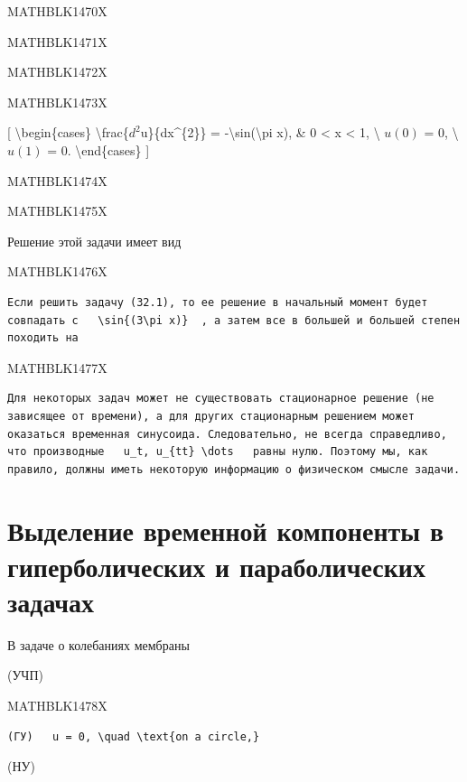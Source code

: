 \documentclass[
]{article}
\begin{document}
{{{MATHBLK1470X

MATHBLK1471X

MATHBLK1472X

MATHBLK1473X

{[} \textbackslash begin\{cases\}
\textbackslash frac\{\(d^{2}\)u\}\{dx\^{}\{2\}\} =
-\textbackslash sin(\textbackslash pi x), \& 0 \textless{} x \textless{}
1, \textbackslash{} \(u(0)\) = 0, \textbackslash{} \(u(1)\) = 0.
\textbackslash end\{cases\} {]}

MATHBLK1474X

MATHBLK1475X

Решение этой задачи имеет вид

MATHBLK1476X

\begin{verbatim}
Если решить задачу (32.1), то ее решение в начальный момент будет совпадать с   \sin{(3\pi x)}  , а затем все в большей и большей степен походить на
\end{verbatim}

MATHBLK1477X

\begin{verbatim}
Для некоторых задач может не существовать стационарное решение (не зависящее от времени), а для других стационарным решением может оказаться временная синусоида. Следовательно, не всегда справедливо, что производные   u_t, u_{tt} \dots   равны нулю. Поэтому мы, как правило, должны иметь некоторую информацию о физическом смысле задачи.
\end{verbatim}

\section{Выделение временной компоненты в гиперболических и
параболических
задачах}\label{ux432ux44bux434ux435ux43bux435ux43dux438ux435-ux432ux440ux435ux43cux435ux43dux43dux43eux439-ux43aux43eux43cux43fux43eux43dux435ux43dux442ux44b-ux432-ux433ux438ux43fux435ux440ux431ux43eux43bux438ux447ux435ux441ux43aux438ux445-ux438-ux43fux430ux440ux430ux431ux43eux43bux438ux447ux435ux441ux43aux438ux445-ux437ux430ux434ux430ux447ux430ux445}

В задаче о колебаниях мембраны

(УЧП)

MATHBLK1478X

\begin{verbatim}
(ГУ)   u = 0, \quad \text{on a circle,} 
\end{verbatim}

(НУ)

}}}
\end{document}
